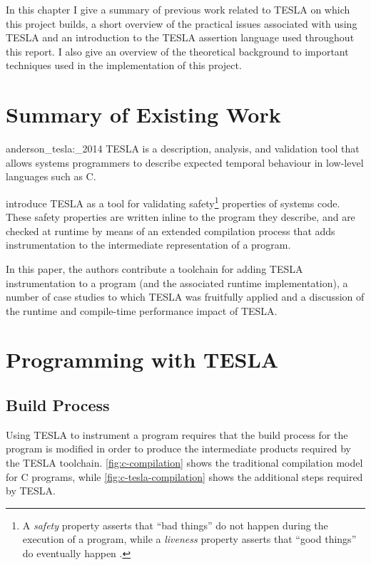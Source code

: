 In this chapter I give a summary of previous work related to TESLA on which this
project builds, a short overview of the practical issues associated with using
TESLA and an introduction to the TESLA assertion language used throughout this
report. I also give an overview of the theoretical background to important
techniques used in the implementation of this project.

\section{Summary of Existing Work}

\begin{displaycquote}[p. 1]{anderson_tesla:_2014}
TESLA is a description, analysis, and validation tool that allows systems
  programmers to describe expected temporal behaviour in low-level languages
  such as C.
\end{displaycquote}

\textcite{anderson_tesla:_2014} introduce TESLA as a tool for validating
safety\footnote{A \emph{safety} property asserts that ``bad things'' do not
happen during the execution of a program, while a \emph{liveness} property
asserts that ``good things'' do eventually happen
\cite{lamport_proving_1977,alpern_defining_1984}.} properties of systems code.
These safety properties are written inline to the program they describe, and are
checked at runtime by means of an extended compilation process that adds
instrumentation to the intermediate representation of a program.

In this paper, the authors contribute a toolchain for adding TESLA
instrumentation to a program (and the associated runtime implementation), a
number of case studies to which TESLA was fruitfully applied and a discussion of
the runtime and compile-time performance impact of TESLA.

\section{Programming with TESLA}

\subsection{Build Process}

Using TESLA to instrument a program requires that the build process for the
program is modified in order to produce the intermediate products required by
the TESLA toolchain. \autoref{fig:c-compilation} shows the traditional
compilation model for C programs, while \autoref{fig:c-tesla-compilation} shows
the additional steps required by TESLA.

